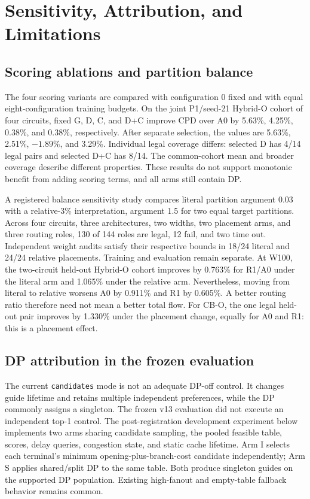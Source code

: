 \documentclass[conference,10pt]{IEEEtran}
\begin{document}
\clearpage
\section{Sensitivity, Attribution, and Limitations}
\subsection{Scoring ablations and partition balance}
The four scoring variants are compared with configuration 0 fixed and with equal eight-configuration training budgets. On the joint P1/seed-21 Hybrid-O cohort of four circuits, fixed G, D, C, and D+C improve CPD over A0 by 5.63\%, 4.25\%, 0.38\%, and 0.38\%, respectively. After separate selection, the values are 5.63\%, 2.51\%, $-1.89\%$, and 3.29\%. Individual legal coverage differs: selected D has 4/14 legal pairs and selected D+C has 8/14. The common-cohort mean and broader coverage describe different properties. These results do not support monotonic benefit from adding scoring terms, and all arms still contain DP.

A registered balance sensitivity study compares literal partition argument 0.03 with a relative-3\% interpretation, argument 1.5 for two equal target partitions. Across four circuits, three architectures, two widths, two placement arms, and three routing roles, 130 of 144 roles are legal, 12 fail, and two time out. Independent weight audits satisfy their respective bounds in 18/24 literal and 24/24 relative placements. Training and evaluation remain separate. At W100, the two-circuit held-out Hybrid-O cohort improves by 0.763\% for R1/A0 under the literal arm and 1.065\% under the relative arm. Nevertheless, moving from literal to relative worsens A0 by 0.911\% and R1 by 0.605\%. A better routing ratio therefore need not mean a better total flow. For CB-O, the one legal held-out pair improves by 1.330\% under the placement change, equally for A0 and R1: this is a placement effect.

\subsection{DP attribution in the frozen evaluation}
The current \texttt{candidates} mode is not an adequate DP-off control. It changes guide lifetime and retains multiple independent preferences, while the DP commonly assigns a singleton. The frozen v13 evaluation did not execute an independent top-1 control. The post-registration development experiment below implements two arms sharing candidate sampling, the pooled feasible table, scores, delay queries, congestion state, and static cache lifetime. Arm I selects each terminal's minimum opening-plus-branch-cost candidate independently; Arm S applies shared/split DP to the same table. Both produce singleton guides on the supported DP population. Existing high-fanout and empty-table fallback behavior remains common.
\end{document}
